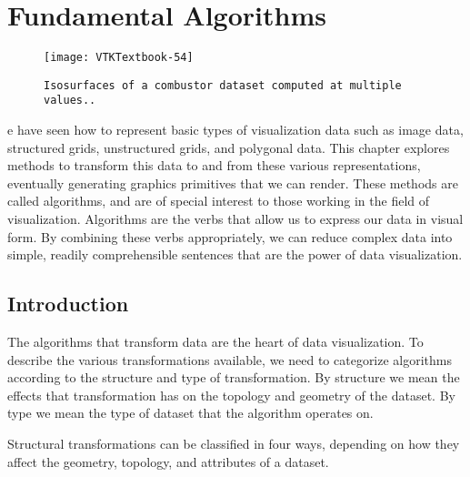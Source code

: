 \chapter{Fundamental Algorithms}
\label{chap:fundamental_algorithms}

\begin{figure}[ht]
	\hfill
	\begin{minipage}{0.5\textwidth}
		\centering
		\texttt{[image: VTKTextbook-54]}\\
		\caption*{\texttt{Isosurfaces of a combustor dataset computed at multiple values..}}
	\end{minipage}
\end{figure}

e have seen how to represent basic types of visualization data such as image data, structured grids, unstructured grids, and polygonal data.
This chapter explores methods to transform this data to and from these various representations, eventually generating graphics primitives that we can render.
These methods are called algorithms, and are of special interest to those working in the field of visualization.
Algorithms are the verbs that allow us to express our data in visual form.
By combining these verbs appropriately, we can reduce complex data into simple, readily comprehensible sentences that are the power of data visualization.

\section{Introduction}

The algorithms that transform data are the heart of data visualization.
To describe the various transformations available, we need to categorize algorithms according to the structure and type of transformation.
By structure we mean the effects that transformation has on the topology and geometry of the dataset.
By type we mean the type of dataset that the algorithm operates on.

Structural transformations can be classified in four ways, depending on how they affect the geometry, topology, and attributes of a dataset.

